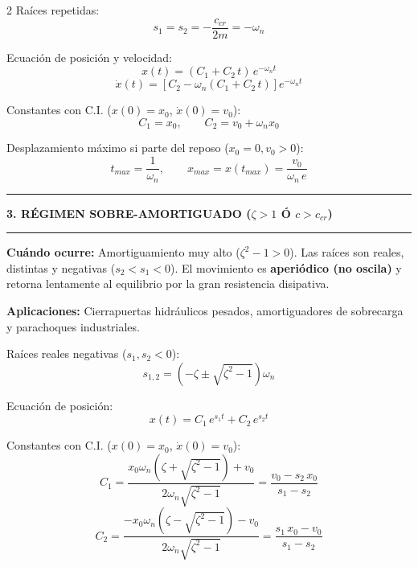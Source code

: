 \documentclass[10pt,a4paper]{article}
\newcommand{\seccion}[1]{%
  \vspace{1.5mm}\hrule\vspace{1mm}%
  \textbf{\footnotesize\MakeUppercase{#1}}\vspace{1mm}\hrule\vspace{1.5mm}}
\begin{document}
\begin{multicols}{2}
Raíces repetidas:
\begin{equation*}
  s_1 = s_2 = -\frac{c_{cr}}{2m} = -\omega_n
\end{equation*}

Ecuación de posición y velocidad:
\begin{equation*}
  x(t) = (C_1 + C_2\,t)\,e^{-\omega_n t}
\end{equation*}
\begin{equation*}
  \dot{x}(t) = \left[ C_2 - \omega_n(C_1 + C_2\,t) \right] e^{-\omega_n t}
\end{equation*}

Constantes con C.I. ($x(0)=x_0$, $\dot{x}(0)=v_0$):
\begin{equation*}
  C_1 = x_0,
  \qquad
  C_2 = v_0 + \omega_n x_0
\end{equation*}

Desplazamiento máximo si parte del reposo ($x_0=0, v_0 > 0$):
\begin{equation*}
  t_{max} = \frac{1}{\omega_n},
  \qquad
  x_{max} = x(t_{max}) = \frac{v_0}{\omega_n\,e}
\end{equation*}

\newpage

\seccion{3. Régimen Sobre-amortiguado ($\zeta > 1$ ó $c > c_{cr}$)}

\textbf{Cuándo ocurre:}
Amortiguamiento muy alto ($\zeta^2-1 > 0$). Las raíces son reales, distintas y negativas ($s_2 < s_1 < 0$). El movimiento es \textbf{aperiódico (no oscila)} y retorna lentamente al equilibrio por la gran resistencia disipativa.

\textbf{Aplicaciones:} Cierrapuertas hidráulicos pesados, amortiguadores de sobrecarga y parachoques industriales.

Raíces reales negativas ($s_1, s_2 < 0$):
\begin{equation*}
  s_{1,2} = \left(-\zeta \pm \sqrt{\zeta^{2}-1}\right)\omega_n
\end{equation*}

Ecuación de posición:
\begin{equation*}
  x(t) = C_1\,e^{s_1 t} + C_2\,e^{s_2 t}
\end{equation*}

Constantes con C.I. ($x(0)=x_0$, $\dot{x}(0)=v_0$):
\begin{equation*}
  C_1 = \frac{x_0\omega_n\left(\zeta + \sqrt{\zeta^2-1}\right) + v_0}{2\omega_n\sqrt{\zeta^2-1}} = \frac{v_0 - s_2\,x_0}{s_1 - s_2}
\end{equation*}
\begin{equation*}
  C_2 = \frac{-x_0\omega_n\left(\zeta - \sqrt{\zeta^2-1}\right) - v_0}{2\omega_n\sqrt{\zeta^2-1}} = \frac{s_1\,x_0 - v_0}{s_1 - s_2}
\end{equation*}


\end{multicols}
\end{document}
